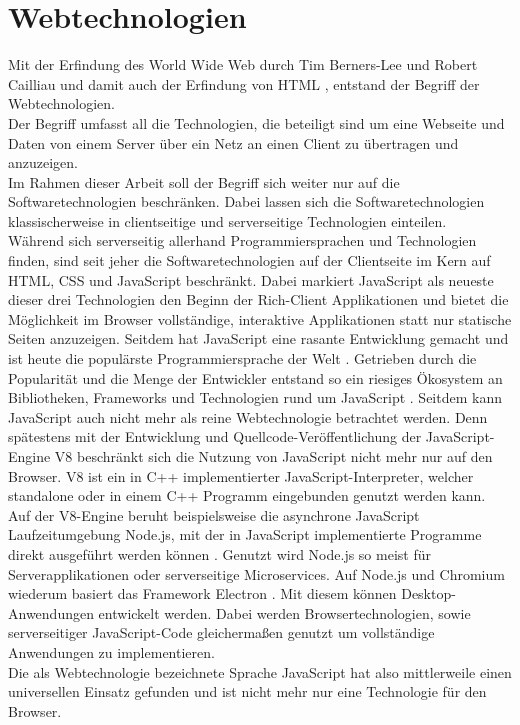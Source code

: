 \section{Webtechnologien}
\label{sec:webtechnologien}

Mit der Erfindung des World Wide Web durch Tim Berners-Lee und Robert Cailliau und damit auch der Erfindung 
von HTML \cite{www}, entstand der Begriff der Webtechnologien.\\
Der Begriff umfasst all die Technologien, die beteiligt sind um eine Webseite und Daten von einem Server über ein 
Netz an einen Client zu übertragen und anzuzeigen.\\

Im Rahmen dieser Arbeit soll der Begriff sich weiter nur auf die Softwaretechnologien beschränken. Dabei lassen
sich die Softwaretechnologien klassischerweise in clientseitige und serverseitige Technologien einteilen.\\
Während sich serverseitig allerhand Programmiersprachen und Technologien finden, sind seit jeher die Softwaretechnologien
auf der Clientseite im Kern auf HTML, CSS und JavaScript beschränkt. Dabei markiert JavaScript als neueste dieser
drei Technologien \cite{jspress} den Beginn der Rich-Client Applikationen und bietet die Möglichkeit im Browser 
vollständige, interaktive Applikationen statt nur statische Seiten anzuzeigen. Seitdem hat JavaScript eine rasante 
Entwicklung gemacht und ist heute die populärste Programmiersprache der Welt \cite{npmstat}. Getrieben durch 
die Popularität und die Menge der Entwickler entstand so ein riesiges Ökosystem an Bibliotheken, Frameworks
und Technologien rund um JavaScript \cite{npmstat}. Seitdem kann JavaScript auch nicht mehr als reine Webtechnologie
betrachtet werden.
Denn spätestens mit der Entwicklung und Quellcode-Veröffentlichung der JavaScript-Engine V8 \cite{v8} beschränkt 
sich die Nutzung von JavaScript nicht mehr nur auf den Browser. V8 ist ein in C++ implementierter JavaScript-Interpreter, 
welcher standalone oder in einem C++ Programm eingebunden genutzt werden kann. Auf der V8-Engine beruht beispielsweise 
die asynchrone JavaScript Laufzeitumgebung Node.js, mit der in JavaScript implementierte Programme direkt ausgeführt 
werden können \cite{node}. Genutzt wird Node.js so meist für Serverapplikationen oder serverseitige Microservices.
Auf Node.js und Chromium wiederum basiert das Framework Electron \cite{electron}. Mit diesem können Desktop-Anwendungen
entwickelt werden. Dabei werden Browsertechnologien, sowie serverseitiger JavaScript-Code gleichermaßen
genutzt um vollständige Anwendungen zu implementieren.\\
Die als Webtechnologie bezeichnete Sprache JavaScript hat also mittlerweile einen universellen Einsatz gefunden 
und ist nicht mehr nur eine Technologie für den Browser.\\

